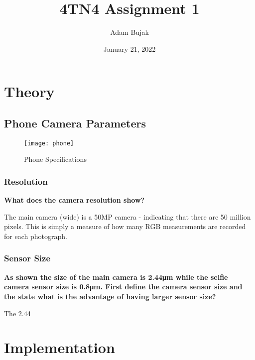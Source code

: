 \documentclass[12pt, letterpaper]{article}
\title{4TN4 Assignment 1}
\author{Adam Bujak}
\date{January 21, 2022}
\begin{document}
\maketitle

\section{Theory}

\subsection{Phone Camera Parameters}

\begin{figure}[h]
    \centering
    \texttt{[image: phone]}
    \caption{Phone Specifications}
    \label{fig:mesh1}
\end{figure}

\subsubsection{Resolution}

\textbf{What does the camera resolution show?}

The main camera (wide) is a 50MP camera - indicating that there are 50 million pixels. This is simply a measure of how many RGB measurements are recorded for each photograph.

\subsubsection{Sensor Size}

\textbf{As shown the size of the main camera is 2.44μm while the selfie camera sensor size is 0.8μm. First define the
camera sensor size and the state what is the advantage of having larger sensor size?}

The 2.44

\section*{Implementation}
\end{document}
